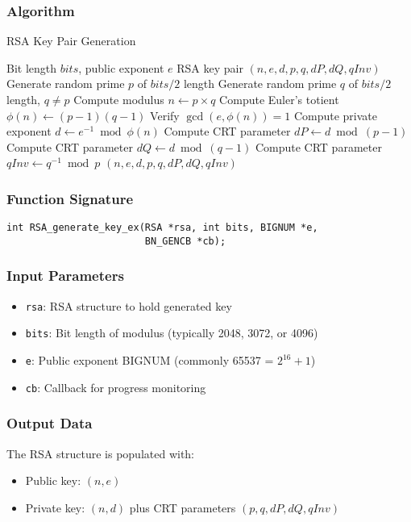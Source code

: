 \subsubsection{Algorithm}
\begin{algorithm}
    \caption{RSA Key Pair Generation}
    \begin{algorithmic}[1]
        \Require Bit length $bits$, public exponent $e$
        \Ensure RSA key pair $(n, e, d, p, q, dP, dQ, qInv)$
        \State Generate random prime $p$ of $bits/2$ length
        \State Generate random prime $q$ of $bits/2$ length, $q \neq p$
        \State Compute modulus $n \gets p \times q$
        \State Compute Euler's totient $\phi(n) \gets (p-1)(q-1)$
        \State Verify $\gcd(e, \phi(n)) = 1$
        \State Compute private exponent $d \gets e^{-1} \bmod \phi(n)$
        \State Compute CRT parameter $dP \gets d \bmod (p-1)$
        \State Compute CRT parameter $dQ \gets d \bmod (q-1)$
        \State Compute CRT parameter $qInv \gets q^{-1} \bmod p$
        \State \Return $(n, e, d, p, q, dP, dQ, qInv)$
    \end{algorithmic}
\end{algorithm}

\subsubsection{Function Signature}
\begin{verbatim}
int RSA_generate_key_ex(RSA *rsa, int bits, BIGNUM *e,
                        BN_GENCB *cb);
\end{verbatim}

\subsubsection{Input Parameters}
\begin{itemize}
    \item \texttt{rsa}: RSA structure to hold generated key
    \item \texttt{bits}: Bit length of modulus (typically 2048, 3072, or 4096)
    \item \texttt{e}: Public exponent BIGNUM (commonly 65537 = $2^{16}+1$)
    \item \texttt{cb}: Callback for progress monitoring
\end{itemize}

\subsubsection{Output Data}
The RSA structure is populated with:
\begin{itemize}
    \item Public key: $(n, e)$
    \item Private key: $(n, d)$ plus CRT parameters $(p, q, dP, dQ, qInv)$
\end{itemize}

